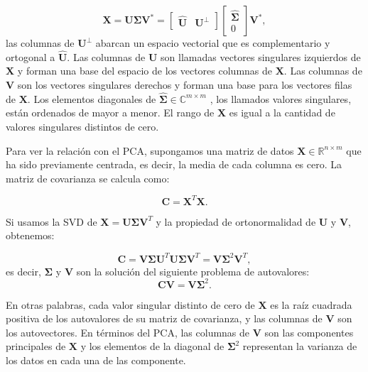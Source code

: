 \begin{equation}
	\mathbf{X} = \mathbf{U} \mathbf{\Sigma} \mathbf{V}^* = \begin{bmatrix} 	\hat{\mathbf{U}} & \mathbf{U}^\perp \end{bmatrix} \begin{bmatrix} \hat{\mathbf{\Sigma}} \\ 0 \end{bmatrix} \mathbf{V}^*,
\end{equation}
las columnas de $\mathbf{U}^\perp$ abarcan un espacio vectorial que es complementario y ortogonal a $\hat{\mathbf{U}}$. Las columnas de $\mathbf{U}$ son llamadas vectores singulares izquierdos de $\mathbf{X}$ y forman una base del espacio de los vectores columnas de $\mathbf{X}$. Las columnas de $\mathbf{V}$ son los vectores singulares derechos y forman una base para los vectores filas de $\mathbf{X}$. Los elementos diagonales de $\hat{\mathbf{\Sigma}} \in \mathbb{C}^{m \times m}$ , los llamados valores singulares, están ordenados de mayor a menor. El rango de $\mathbf{X}$ es igual a la cantidad de valores singulares distintos de cero.

Para ver la relación con el PCA, supongamos una matriz de datos $\mathbf{X} \in \mathbb{R}^{n \times m}$ que ha sido previamente centrada, es decir, la media de cada columna es cero. La matriz de covarianza se calcula como:

\begin{equation}
	\mathbf{C} = \mathbf{X}^T  \mathbf{X}.
\end{equation}

Si usamos la SVD de $\mathbf{X} = \mathbf{U} \mathbf{\Sigma} \mathbf{V}^T$ y la propiedad de ortonormalidad de $\mathbf{U}$ y $\mathbf{V}$, obtenemos:

\begin{equation}
	\mathbf{C} = \mathbf{V} \mathbf{\Sigma} \mathbf{U}^T \mathbf{U} \mathbf{\Sigma} \mathbf{V}^T =  \mathbf{V} \mathbf{\Sigma}^2 \mathbf{V}^T,
\end{equation}
es decir, $\mathbf{\Sigma}$ y $\mathbf{V}$ son la solución del siguiente problema de autovalores:
\begin{equation}
	\mathbf{C} \mathbf{V} = \mathbf{V} \mathbf{\Sigma}^2.
\end{equation}

En otras palabras, cada valor singular distinto de cero de $\mathbf{X}$ es la raíz cuadrada positiva de los autovalores de su matriz de covarianza, y las columnas de $\mathbf{V}$ son los autovectores. En términos del PCA, las columnas de $\mathbf{V}$ son las componentes principales de $\mathbf{X}$ y los elementos de la diagonal de $\mathbf{\Sigma}^2$ representan la varianza de los datos en cada una de las componente.

